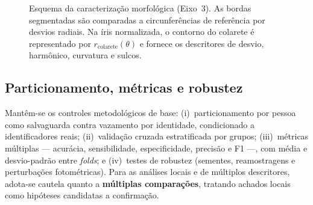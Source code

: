\documentclass[12pt,a4paper]{article}
\begin{document}
\begin{figure}[H]
\centering
{}
\caption{Esquema da caracterização morfológica (Eixo~3). As bordas segmentadas são comparadas a
circunferências de referência por desvios radiais. Na íris normalizada, o contorno do colarete é
representado por $r_{\mathrm{colarete}}(\theta)$ e fornece os descritores de desvio, harmônico,
curvatura e sulcos.}
\label{fig:morfologia}
\end{figure}

\subsection{Particionamento, métricas e robustez}
Mantêm-se os controles metodológicos de base: (i)~particionamento por pessoa como
salvaguarda contra vazamento por identidade, condicionado a identificadores reais;
(ii)~validação cruzada estratificada por grupos; (iii)~métricas
múltiplas --- acurácia, sensibilidade, especificidade, precisão e F1 ---, com média e desvio-padrão
entre \textit{folds}; e (iv)~testes de robustez (sementes, reamostragens e perturbações fotométricas).
Para as análises locais e de múltiplos descritores, adota-se cautela quanto a \textbf{múltiplas
comparações}, tratando achados locais como hipóteses candidatas a confirmação.
\end{document}
